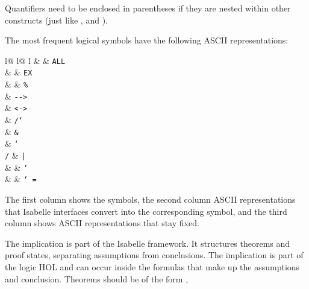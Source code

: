 \begin{isabellebody}
\begin{isamarkuptext}
\begin{warn}
\end{warn}
\begin{warn}
Quantifiers need to be enclosed in parentheses if they are nested within
other constructs (just like ,  and ).
\end{warn}
The most frequent logical symbols have the following ASCII representations:
\begin{center}
\begin{tabular}{l@ {\qquad}l@ {\qquad}l}
 &  & \texttt{ALL}\\
 &  & \texttt{EX}\\
 &  & \texttt{\%}\\
 & \texttt{-{}->}\\
 & \texttt{<->}\\
 & \texttt{/\char`\\} & \texttt{\&}\\
 & \texttt{\char`\\/} & \texttt{|}\\
 &  & \texttt{\char`~}\\
 &  & \texttt{\char`~=}
\end{tabular}
\end{center}
The first column shows the symbols, the second column ASCII representations
that Isabelle interfaces convert into the corresponding symbol,
and the third column shows ASCII representations that stay fixed.
\begin{warn}
The implication  is part of the Isabelle framework. It structures
theorems and proof states, separating assumptions from conclusions.
The implication  is part of the logic HOL and can occur inside the
formulas that make up the assumptions and conclusion.
Theorems should be of the form ,

\end{warn}
\end{isamarkuptext}
\end{isabellebody}
